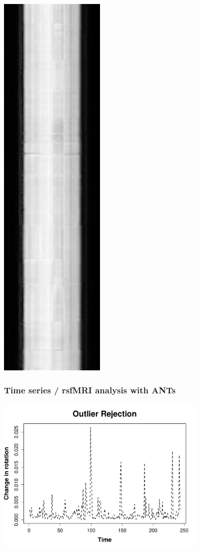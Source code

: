 \documentclass[18pt]{beamer}
\begin{document}
\begin{frame}
\includegraphics[width=2in]{../figures/rsfmri_smooth.jpg}
\end{frame}

\begin{frame}
\frametitle{Time series / rsfMRI analysis with ANTs}
\includegraphics[width=4in]{../figures/rsfmriplot1.pdf}
\end{frame}
\end{document}
